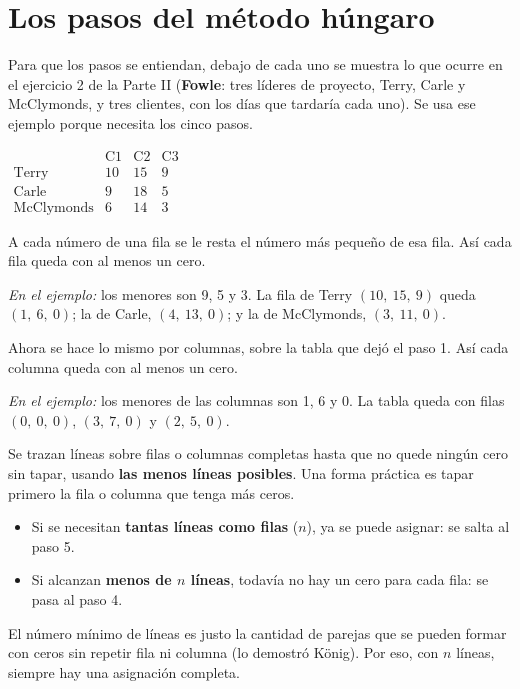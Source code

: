 \documentclass[11pt,a4paper]{article}
\begin{document}
\section{Los pasos del método húngaro}\label{sec:algoritmo}

\noindent\begin{minipage}[c]{0.64\textwidth}
Para que los pasos se entiendan, debajo de cada uno se muestra lo que ocurre en el ejercicio 2 de la Parte II
(\textbf{Fowle}: tres líderes de proyecto, Terry, Carle y McClymonds, y tres clientes, con los días que tardaría cada
uno). Se usa ese ejemplo porque necesita los cinco pasos.
\end{minipage}\hfill
\begin{minipage}[c]{0.32\textwidth}\centering\small
$\begin{array}{l|ccc}
 & \text{C1} & \text{C2} & \text{C3}\\ \hline
\text{Terry} & 10 & 15 & 9\\
\text{Carle} & 9 & 18 & 5\\
\text{McClymonds} & 6 & 14 & 3
\end{array}$
\end{minipage}
\par

A cada número de una fila se le resta el número más pequeño de esa fila. Así cada fila queda con al menos un cero.

\textit{En el ejemplo:} los menores son 9, 5 y 3. La fila de Terry $(10,\ 15,\ 9)$ queda $(1,\ 6,\ 0)$; la de Carle,
$(4,\ 13,\ 0)$; y la de McClymonds, $(3,\ 11,\ 0)$.

Ahora se hace lo mismo por columnas, sobre la tabla que dejó el paso 1. Así cada columna queda con al menos un cero.

\textit{En el ejemplo:} los menores de las columnas son 1, 6 y 0. La tabla queda con filas $(0,\ 0,\ 0)$,
$(3,\ 7,\ 0)$ y $(2,\ 5,\ 0)$.

Se trazan líneas sobre filas o columnas completas hasta que no quede ningún cero sin tapar, usando
\textbf{las menos líneas posibles}. Una forma práctica es tapar primero la fila o columna que tenga más ceros.
\begin{itemize}[itemsep=2pt]
  \item Si se necesitan \textbf{tantas líneas como filas} ($n$), ya se puede asignar: se salta al paso 5.
  \item Si alcanzan \textbf{menos de $n$ líneas}, todavía no hay un cero para cada fila: se pasa al paso 4.
\end{itemize}
El número mínimo de líneas es justo la cantidad de parejas que se pueden formar con ceros sin repetir fila ni
columna (lo demostró König). Por eso, con $n$ líneas, siempre hay una asignación completa.
\end{document}
